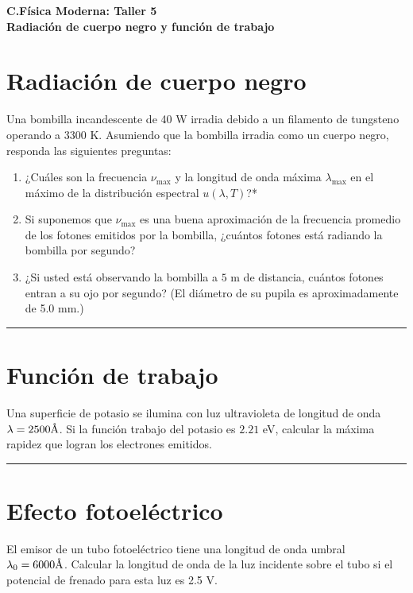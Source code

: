 \documentclass[12pt]{article}
\newcommand{\angstrom}{\mbox{\normalfont\AA}}
\begin{document}
 
\begin{center}
\Large \textbf{C.Física Moderna: Taller 5}\\
\normalsize \textbf{Radiación de cuerpo negro y función de trabajo}
\end{center}
 
  

\section{Radiación de cuerpo negro}


Una bombilla incandescente de 40 W irradia debido a un filamento de tungsteno operando
a 3300 K. Asumiendo que la bombilla irradia como un cuerpo negro, responda las siguientes preguntas:
\begin{enumerate}
	\item  ¿Cuáles son la frecuencia $\nu_{\text{max}}$  y la longitud de onda máxima $\lambda_{\text{max}}$  en el máximo de la distribución espectral $u(\lambda,T)$?*
	\item  Si suponemos que $\nu_{\text{max}}$ es una buena aproximación de la frecuencia promedio de los fotones
	emitidos por la bombilla, ¿cuántos fotones está radiando la bombilla por segundo?
	\item  ¿Si usted está observando la bombilla a $5$ m de distancia, cuántos fotones entran a su ojo
	por segundo? (El diámetro de su pupila es aproximadamente de 5.0 mm.)
\end{enumerate}


\noindent\rule{16.5cm}{0.4pt}

\section{Función de trabajo}

 Una superficie de potasio se ilumina con luz ultravioleta de longitud de onda $\lambda = 2500\angstrom$.
Si la función trabajo del potasio es $2.21$ eV, calcular la máxima rapidez que logran los
electrones emitidos.






\noindent\rule{16.5cm}{0.4pt}



\section{Efecto fotoeléctrico}

El emisor de un tubo fotoeléctrico tiene una longitud de onda umbral $\lambda_0= 6000\angstrom$. Calcular la longitud de onda de la luz incidente sobre el tubo si el potencial de frenado para esta luz es 2.5 V.
\end{document}
